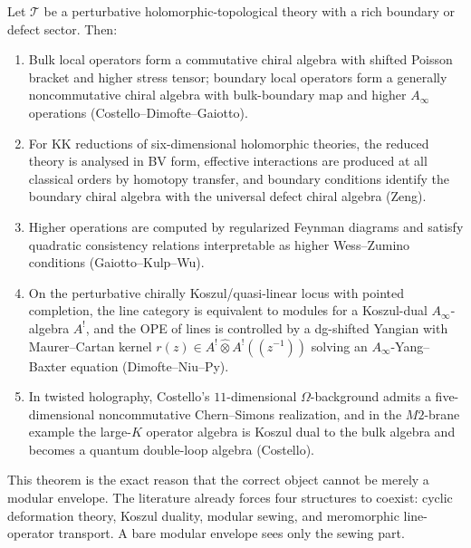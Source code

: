 \begin{theorem}
\ClaimStatusProvedElsewhere
Let $\mathcal{T}$ be a perturbative holomorphic-topological theory
with a rich boundary or defect sector. Then:
\begin{enumerate}[label=\textup{(\arabic*)}]
\item Bulk local operators form a commutative chiral algebra with
shifted Poisson bracket and higher stress tensor; boundary local
operators form a generally noncommutative chiral algebra with
bulk-boundary map and higher $A_\infty$ operations
\textup{(Costello--Dimofte--Gaiotto)}.
\item For KK reductions of six-dimensional holomorphic theories,
the reduced theory is analysed in BV form, effective interactions
are produced at all classical orders by homotopy transfer, and
boundary conditions identify the boundary chiral algebra with the
universal defect chiral algebra \textup{(Zeng)}.
\item Higher operations are computed by regularized Feynman diagrams
and satisfy quadratic consistency relations interpretable as higher
Wess--Zumino conditions \textup{(Gaiotto--Kulp--Wu)}.
\item On the perturbative chirally Koszul/quasi-linear locus with
pointed completion, the line category is equivalent to modules
for a Koszul-dual $A_\infty$-algebra $A^!$, and the OPE of lines
is controlled by a dg-shifted Yangian with Maurer--Cartan kernel
$r(z) \in A^! \widehat\otimes A^!(\!(z^{-1})\!)$
solving an $A_\infty$-Yang--Baxter equation
\textup{(Dimofte--Niu--Py)}.
\item In twisted holography, Costello's $11$-dimensional
$\Omega$-background admits a five-dimensional noncommutative
Chern--Simons realization, and in the $M2$-brane example the
large-$K$ operator algebra is Koszul dual to the bulk algebra
and becomes a quantum double-loop algebra \textup{(Costello)}.
\end{enumerate}
\end{theorem}

\begin{remark}
This theorem is the exact reason that the correct
object cannot be merely a modular envelope. The literature already
forces four structures to coexist: cyclic deformation theory, Koszul
duality, modular sewing, and meromorphic line-operator transport.
A bare modular envelope sees only the sewing part.
\end{remark}

